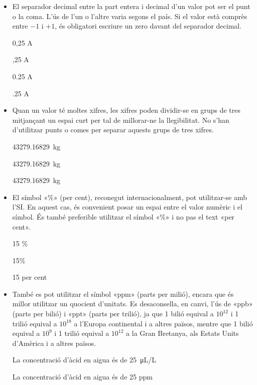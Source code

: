 \begin{itemize}
\item El separador decimal entre la part entera i decimal d'un valor pot ser el punt o la coma. L'ús de l'un o l'altre varia segons el país. Si el valor està comprès entre $-1$ i $+1$, és obligatori escriure un zero davant del separador decimal.

\textcolor{Green}\faCheckSquare{} 0,25 A

\textcolor{Red}\faTimesCircle{}  ,25 A

\textcolor{Green}\faCheckSquare{} 0.25 A

\textcolor{Red}\faTimesCircle{}  .25 A


\item Quan un valor té moltes xifres, les xifres poden dividir-se en grups de tres mitjançant un espai curt per tal de millorar-ne la llegibilitat. No s'han d'utilitzar punts o comes per separar aquests grups de tres xifres.

\textcolor{Green}\faCheckSquare{} \qty{43279,16829}{kg}

\textcolor{Green}\faCheckSquare{} \qty[group-separator =]{43279,16829}{kg}

\textcolor{Red}\faTimesCircle{}  \qty[group-separator = .]{43279,16829}{kg}

\item El símbol «\%» (per cent), reconegut internacionalment, pot utilitzar-se amb l'SI. En aquest cas, és convenient posar un espai entre el valor numèric i el símbol. És també preferible utilitzar el símbol «\%» i no pas el text  «per cent».

\textcolor{Green}\faCheckSquare{} 15 \%

\textcolor{Blue}\faExclamationTriangle{} 15\%

\textcolor{Blue}\faExclamationTriangle{} 15 per cent


\item També es pot utilitzar el símbol «ppm» (parts per milió), encara que és millor utilitzar un quocient d'unitats. Es desaconsella, en canvi, l'ús de «ppb» (parts per bilió) i «ppt» (parts per trilió), ja que 1 bilió equival a $10^{12}$ i 1 trilió equival a $10^{18}$ a l'Europa continental i a altres països, mentre que 1 bilió equival a $10^{9}$ i 1 trilió equival a $10^{12}$ a la Gran Bretanya, als Estats Units d'Amèrica i a altres països.

\textcolor{Green}\faCheckSquare{} La concentració d'àcid en aigua és de \qty{25}{\micro L/L}

\textcolor{Blue}\faExclamationTriangle{} La concentració d'àcid en aigua és de 25 ppm

\end{itemize}


